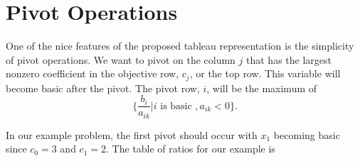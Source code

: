 \section*{Pivot Operations}

One of the nice features of the proposed tableau representation is the simplicity of pivot operations. 
We want to pivot on the column $j$ that has the largest nonzero coefficient in the objective row, $c_j$, or the top row. This variable will become basic after the pivot. The pivot row,  $i$, will be the maximum of 
\begin{equation}
\{\frac{b_i}{a_{ik}}| i \text{ is basic }, a_{ik} < 0\}.
\end{equation}

In our example problem, the first pivot should occur with $x_1$ becoming basic since $c_0 = 3$ and $c_1 = 2$. 
The table of ratios for our example is 


